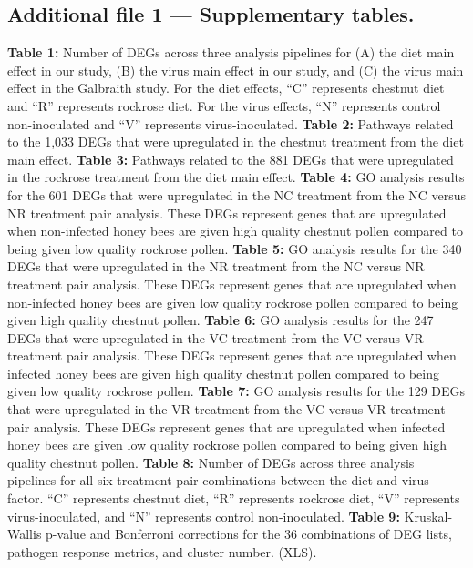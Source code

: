 \documentclass{bmcart}
\begin{document}
\begin{linenumbers}
\begin{backmatter}
  \subsection*{Additional file 1 --- Supplementary tables.}
    \textbf{Table 1:} Number of DEGs across three analysis pipelines for (A) the diet main effect in our study, (B) the virus main effect in our study, and (C) the virus main effect in the Galbraith study. For the diet effects, ``C'' represents chestnut diet and ``R'' represents rockrose diet. For the virus effects, ``N'' represents control non-inoculated and ``V'' represents virus-inoculated.
    \textbf{Table 2:} Pathways related to the 1,033 DEGs that were upregulated in the chestnut treatment from the diet main effect.
    \textbf{Table 3:} Pathways related to the 881 DEGs that were upregulated in the rockrose treatment from the diet main effect.
    \textbf{Table 4:} GO analysis results for the 601 DEGs that were upregulated in the NC treatment from the NC versus NR treatment pair analysis. These DEGs represent genes that are upregulated when non-infected honey bees are given high quality chestnut pollen compared to being given low quality rockrose pollen.
    \textbf{Table 5:} GO analysis results for the 340 DEGs that were upregulated in the NR treatment from the NC versus NR treatment pair analysis. These DEGs represent genes that are upregulated when non-infected honey bees are given low quality rockrose pollen compared to being given high quality chestnut pollen.
    \textbf{Table 6:} GO analysis results for the 247 DEGs that were upregulated in the VC treatment from the VC versus VR treatment pair analysis. These DEGs represent genes that are upregulated when infected honey bees are given high quality chestnut pollen compared to being given low quality rockrose pollen.
    \textbf{Table 7:} GO analysis results for the 129 DEGs that were upregulated in the VR treatment from the VC versus VR treatment pair analysis. These DEGs represent genes that are upregulated when infected honey bees are given low quality rockrose pollen compared to being given high quality chestnut pollen.
    \textbf{Table 8:} Number of DEGs across three analysis pipelines for all six treatment pair combinations between the diet and virus factor. ``C'' represents chestnut diet, ``R'' represents rockrose diet, ``V'' represents virus-inoculated, and ``N'' represents control non-inoculated.
    \textbf{Table 9:} Kruskal-Wallis p-value and Bonferroni corrections for the 36 combinations of DEG lists, pathogen response metrics, and cluster number. (XLS).


\end{backmatter}
\end{linenumbers}
\end{document}
